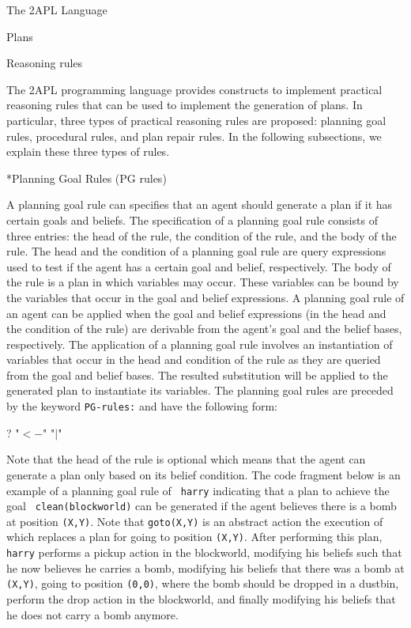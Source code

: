 \begin{chapter}{The 2APL Language}
\begin{section}{Plans}
\end{section}



\begin{section}{Reasoning rules}

The 2APL programming language provides constructs to implement
practical reasoning rules that can be used to implement the
generation of plans. In particular, three types of practical
reasoning rules are proposed: planning goal rules, procedural rules,
and plan repair rules. In the following subsections, we explain
these three types of rules.

\begin{subsection}*{Planning Goal Rules (PG rules)}\label{sec:pgrules}

A planning goal rule can specifies that an agent should generate a
plan if it has certain goals and beliefs. The specification of a
planning goal rule  consists of three entries: the head
of the rule, the condition of the rule, and the body of the rule.
The head and the condition of a planning goal rule are query
expressions used to test if the agent has a certain goal and belief,
respectively. The body of the rule is a plan in which variables may
occur. These variables can be bound by the variables that occur in
the goal and belief expressions. A planning goal rule of an agent
can be applied when the goal and belief expressions (in the head and
the condition of the rule) are derivable from the agent's goal and
the belief bases, respectively.  The application of a planning goal
rule involves an instantiation of variables that occur in the head
and condition of the rule as they are queried from the goal and
belief bases. The resulted substitution will be applied to the
generated plan to instantiate its variables. The planning goal rules
are preceded by the keyword {\tt PG-rules:} and have the following
form:

? "$<-$"  "$|$" 

Note that the head of the rule is optional which means that the
agent can generate a plan only based on its belief condition. The
code fragment below is an example of a planning goal rule of {\tt
harry} indicating that a plan to achieve the goal {\tt
clean(blockworld)} can be generated if the agent believes there is a
bomb at position {\tt (X,Y)}. Note that {\tt goto(X,Y)} is an
abstract action the execution of which replaces a plan for going to
position {\tt (X,Y)}. After performing this plan, {\tt harry}
performs a pickup action in the blockworld, modifying his beliefs
such that he now believes he carries a bomb, modifying his beliefs
that there was a bomb at {\tt (X,Y)}, going to position {\tt (0,0)},
where the bomb should be dropped in a dustbin, perform the drop
action in the blockworld, and finally modifying his beliefs that he
does not carry a bomb anymore.


\end{subsection}
\end{section}
\end{chapter}
